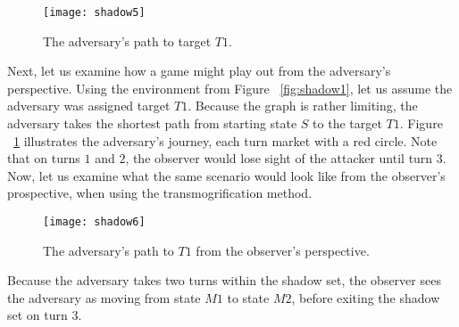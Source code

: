 \begin{figure}[h!]
\begin{center}

  \texttt{[image: shadow5]}
  \end{center}

  \caption{The adversary's path to target $T1$.}
  
  \label{fig:shadow5}
\end{figure}

Next, let us examine how a game might play out from the adversary's perspective.   Using the environment from Figure ~\ref{fig:shadow1}, let us assume the adversary was assigned target $T1$. Because the graph is rather limiting, the adversary takes the shortest path from starting state $S$ to the target $T1$. Figure ~\ref{fig:shadow5} illustrates the adversary's journey, each turn market with a red circle. Note that on turns $1$ and $2$, the observer would lose sight of the attacker until turn $3$. Now, let us examine what the same scenario would look like from the observer's prospective, when using the transmogrification method. 

\begin{figure}[h!]
\begin{center}

  \texttt{[image: shadow6]}
  \end{center}

  \caption{The adversary's path to $T1$ from the observer's perspective.}
  
  \label{fig:shadow6}
\end{figure}

Because the adversary takes two turns within the shadow set, the observer sees the adversary as moving from state $M1$ to state $M2$, before exiting the shadow set on turn 3. 



\nocite{Dijkstra80}
\nocite{plop03-paper}
